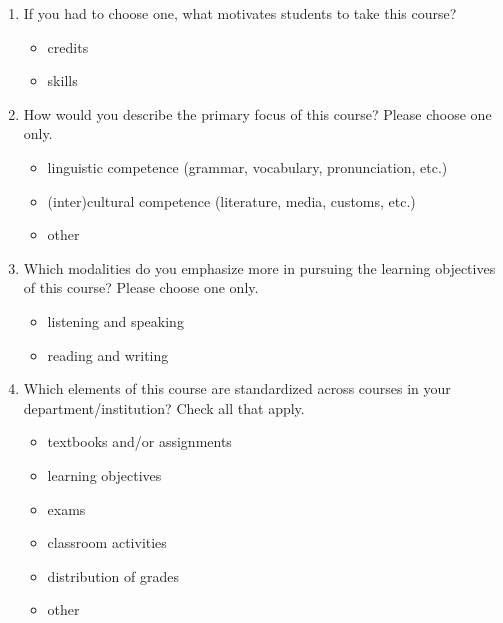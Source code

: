 \documentclass[letterpaper,10pt]{article}
\begin{document}
\begin{enumerate}[resume]
\item If you had to choose one, what motivates students to take this course?
\vspace{-0.1in}\begin{multicols}{2}
\begin{itemize}
	\item credits
	\item skills
\end{itemize}
\end{multicols}

\item How would you describe the primary focus of this course? Please choose one only.
\begin{itemize}
	\item linguistic competence (grammar, vocabulary, pronunciation, etc.) 
	\item (inter)cultural competence (literature, media, customs, etc.) 
	\item other \underline{\hspace{2in}}
\end{itemize}

\item Which modalities do you emphasize more in pursuing the learning objectives of this course? Please choose one only.
\vspace{-0.1in}\begin{multicols}{2}
\begin{itemize}
	\item listening and speaking
	\item reading and writing
\end{itemize}
\end{multicols}

\item Which elements of this course are standardized across courses in your department/institution? Check all that apply.
\vspace{-0.1in}\begin{multicols}{2}
\begin{itemize}
	\item textbooks and/or assignments
	\item learning objectives
	\item exams
	\item classroom activities
	\item distribution of grades
	\item other \underline{\hspace{2in}}
\end{itemize}
\end{multicols}

\end{enumerate}
\end{document}

